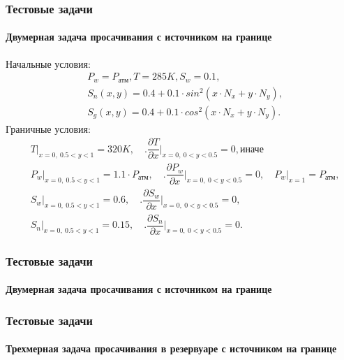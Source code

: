 \documentclass[10pt,pdf,hyperref={unicode}]{beamer} %
\begin{document}
\begin{frame}
\frametitle{Тестовые задачи}
\framesubtitle{Двумерная задача просачивания с источником на границе}
\begin{center}
Начальные условия:
\begin{equation}
  \begin{aligned}
    &P_w=P_\text{атм}, T=285K, S_w=0.1,\\
    &S_n(x, y)=0.4 + 0.1 \cdot sin^2(x \cdot N_x + y \cdot N_y),\\
    &S_g(x, y)=0.4 + 0.1 \cdot cos^2(x \cdot N_x + y \cdot N_y).
   \end{aligned}
\end{equation}
Граничные условия:
\begin{equation}
  \begin{aligned}
    &\left.T\right|_{x=0,\ 0.5 < y < 1}=320K,\quad \Biggl.\dfrac{\partial{T}}{\partial{x}}\Biggr|_{x=0,\ 0 < y < 0.5}=0, \text{иначе}\\
    &\left.P_w\right|_{x=0,\ 0.5 < y < 1}=1.1\cdot P_{\text{атм}},\quad \Biggl.\dfrac{\partial{P_w}}{\partial{x}}\Biggr|_{x=0,\ 0 < y < 0.5}=0,\quad \left.{P_w}\right|_{x=1}=P_{\text{атм}},\\
    &\left.S_w\right|_{x=0,\ 0.5 < y < 1}=0.6,\quad \Biggl.\dfrac{\partial{S_w}}{\partial{x}}\Biggr|_{x=0,\ 0 < y < 0.5}=0,\\
    &\left.S_n\right|_{x=0,\ 0.5 < y < 1}=0.15,\quad \Biggl.\dfrac{\partial{S_n}}{\partial{x}}\Biggr|_{x=0,\ 0 < y < 0.5}=0.
  \end{aligned}
\end{equation}
\end{center}
\end{frame}

\begin{frame}
\frametitle{Тестовые задачи}
\framesubtitle{Двумерная задача просачивания с источником на границе}
\begin{center}

\end{center}
\end{frame}

\begin{frame}
\frametitle{Тестовые задачи}
\framesubtitle{Трехмерная задача просачивания в резервуаре с источником на границе}
\begin{center}

\end{center}
\end{frame}
\end{document}
